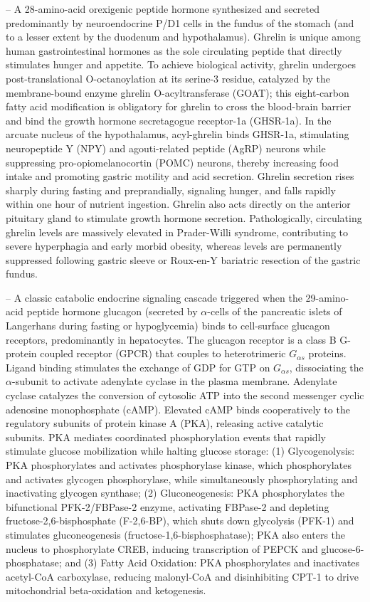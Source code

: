 -- A 28-amino-acid orexigenic peptide hormone synthesized and secreted predominantly by neuroendocrine P/D1 cells in the fundus of the stomach (and to a lesser extent by the duodenum and hypothalamus). Ghrelin is unique among human gastrointestinal hormones as the sole circulating peptide that directly stimulates hunger and appetite. To achieve biological activity, ghrelin undergoes post-translational O-octanoylation at its serine-3 residue, catalyzed by the membrane-bound enzyme ghrelin O-acyltransferase (GOAT); this eight-carbon fatty acid modification is obligatory for ghrelin to cross the blood-brain barrier and bind the growth hormone secretagogue receptor-1a (GHSR-1a). In the arcuate nucleus of the hypothalamus, acyl-ghrelin binds GHSR-1a, stimulating neuropeptide Y (NPY) and agouti-related peptide (AgRP) neurons while suppressing pro-opiomelanocortin (POMC) neurons, thereby increasing food intake and promoting gastric motility and acid secretion. Ghrelin secretion rises sharply during fasting and preprandially, signaling hunger, and falls rapidly within one hour of nutrient ingestion. Ghrelin also acts directly on the anterior pituitary gland to stimulate growth hormone secretion. Pathologically, circulating ghrelin levels are massively elevated in Prader-Willi syndrome, contributing to severe hyperphagia and early morbid obesity, whereas levels are permanently suppressed following gastric sleeve or Roux-en-Y bariatric resection of the gastric fundus.

-- A classic catabolic endocrine signaling cascade triggered when the 29-amino-acid peptide hormone glucagon (secreted by $\alpha$-cells of the pancreatic islets of Langerhans during fasting or hypoglycemia) binds to cell-surface glucagon receptors, predominantly in hepatocytes. The glucagon receptor is a class B G-protein coupled receptor (GPCR) that couples to heterotrimeric $G_{\alpha s}$ proteins. Ligand binding stimulates the exchange of GDP for GTP on $G_{\alpha s}$, dissociating the $\alpha$-subunit to activate adenylate cyclase in the plasma membrane. Adenylate cyclase catalyzes the conversion of cytosolic ATP into the second messenger cyclic adenosine monophosphate (cAMP). Elevated cAMP binds cooperatively to the regulatory subunits of protein kinase A (PKA), releasing active catalytic subunits. PKA mediates coordinated phosphorylation events that rapidly stimulate glucose mobilization while halting glucose storage: (1) Glycogenolysis: PKA phosphorylates and activates phosphorylase kinase, which phosphorylates and activates glycogen phosphorylase, while simultaneously phosphorylating and inactivating glycogen synthase; (2) Gluconeogenesis: PKA phosphorylates the bifunctional PFK-2/FBPase-2 enzyme, activating FBPase-2 and depleting fructose-2,6-bisphosphate (F-2,6-BP), which shuts down glycolysis (PFK-1) and stimulates gluconeogenesis (fructose-1,6-bisphosphatase); PKA also enters the nucleus to phosphorylate CREB, inducing transcription of PEPCK and glucose-6-phosphatase; and (3) Fatty Acid Oxidation: PKA phosphorylates and inactivates acetyl-CoA carboxylase, reducing malonyl-CoA and disinhibiting CPT-1 to drive mitochondrial beta-oxidation and ketogenesis.

